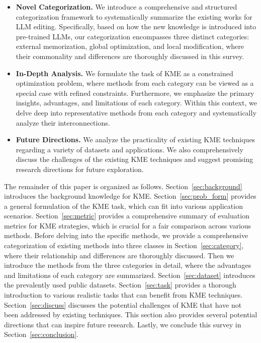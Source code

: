 \documentclass[acmsmall, screen]{acmart}
\begin{document}
\begin{itemize}[leftmargin=0.35cm]

    \item \textbf{Novel Categorization.} We introduce a comprehensive and structured categorization framework to systematically summarize the existing works for LLM editing. Specifically, based on how the new knowledge is introduced into pre-trained LLMs, our categorization encompasses three distinct categories: external memorization, global optimization, and local modification, where their commonality and differences are thoroughly discussed in this survey.
    
    \item \textbf{In-Depth Analysis.} We formulate the task of KME as a constrained optimization problem, where methods from each category can be viewed as a special case with refined constraints. 
    Furthermore, we emphasize the primary insights, advantages, and limitations of each category. Within this context, we delve deep into representative methods from each category and systematically analyze their interconnections.
    
    
    \item \textbf{Future Directions.} We analyze the practicality of existing KME techniques regarding a variety of datasets and applications. We also comprehensively discuss the challenges of the existing KME techniques and suggest promising research directions for future exploration.
\end{itemize}


The remainder of this paper is organized as follows. Section~\ref{sec:background} introduces the background knowledge for KME. Section~\ref{sec:prob_form} provides a general formulation of the KME task, which can fit into various application scenarios. 
Section~\ref{sec:metric} provides a comprehensive summary of evaluation metrics for KME strategies, which is crucial for a fair comparison across various methods.
Before delving into the specific methods, we provide a comprehensive categorization of existing methods into three classes in Section~\ref{sec:category}, where their relationship and differences are thoroughly discussed. Then we introduce the methods from the three categories in detail, where the advantages and limitations of each category are summarized. Section~\ref{sec:dataset} introduces the prevalently used public datasets. Section~\ref{sec:task} provides a thorough introduction to various realistic tasks that can benefit from KME techniques. Section~\ref{sec:discuss} discusses the potential challenges of KME that have not been addressed by existing techniques. This section also provides several potential directions that can inspire future research. Lastly, we conclude this survey in Section~\ref{sec:conclusion}.
\end{document}
